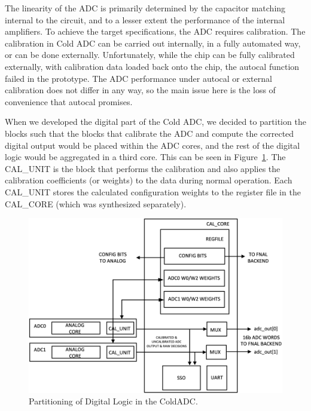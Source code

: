 \label{sec:5.1}


The linearity of the ADC is primarily determined by the capacitor matching internal to the circuit, and to a lesser extent the performance of the internal amplifiers. To achieve the target specifications, the ADC requires calibration. The calibration in Cold ADC can be carried out internally, in a fully automated way, or can be done externally. Unfortunately, while the chip can be fully calibrated externally, with calibration data loaded back onto the chip, the autocal function failed in the prototype. The ADC performance under autocal or external calibration does not differ in any way, so the main issue here is the loss of convenience that autocal promises.

When we developed the digital part of the Cold ADC, we decided to partition the blocks such that the blocks that calibrate the ADC and compute the corrected digital output would be placed within the ADC cores, and the rest of the digital logic would be aggregated in a third core. This can be seen in Figure~\ref{fig:autocalBlock}. The CAL\_UNIT is the block that performs the calibration and also applies the calibration coefficients (or weights) to the data during normal operation. Each CAL\_UNIT stores the calculated configuration weights to the register file in the CAL\_CORE (which was synthesized separately).
\begin{figure}[h]
\centering
\begin{center}
\includegraphics[width=1.0\textwidth]{figures/autocalBlock.png}
\end{center}
\caption{Partitioning of Digital Logic in the ColdADC.}
\label{fig:autocalBlock}
\end{figure}

